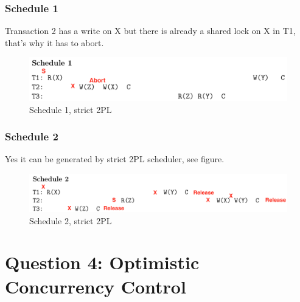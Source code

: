 \documentclass[12pt,a4paper]{article}
\begin{document}
\subsubsection{Schedule 1}
Transaction 2 has a write on X but there is already a shared lock on X in T1, that's why it has to abort.
\begin{figure}[!htb]
	\center
	\includegraphics[width=\textwidth]{img/Schedule1_strict2PL}
	\caption{Schedule 1, strict 2PL}
\end{figure}


\subsubsection{Schedule 2}
Yes it can be generated by strict 2PL scheduler, see figure.
\begin{figure}[!htb]
	\center
	\includegraphics[width=\textwidth]{img/Schedule2_strict2PL}
	\caption{Schedule 2, strict 2PL}
\end{figure}

\section{Question 4: Optimistic Concurrency Control}
\end{document}
